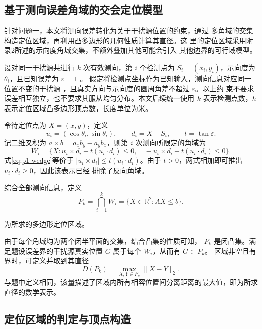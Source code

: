 \subsection{基于测向误差角域的交会定位模型}

针对问题一，本文将测向误差转化为关于干扰源位置的约束，通过
多角域的交集构造定位区域，再利用凸多边形的几何性质计算其直径。这
里的定位区域采用附录2所述的示向度角域交集，不额外叠加其他可能会引入
其他边界的可行域模型。

设对同一干扰源共进行 $k$ 次有效测向，第 $i$ 个检测点为
$S_i=(x_i,y_i)$，示向度为 $\theta_i$，且已知误差为 $\varepsilon=1^\circ$。
假定将检测点坐标作为已知输入，测向信息对应同一位置不变的干扰源
，且真实方向与示向度的圆周角差不超过 $\varepsilon$。以上约
束不要求误差相互独立，也不要求其服从均匀分布。本文后续统一使用
$k$ 表示检测点数，$h$ 表示定位区域凸多边形顶点数，长度单位为米。


令待定位点为 $X=(x,y)$，定义
\begin{equation}
u_i=(\cos\theta_i,\sin\theta_i),\qquad d_i=X-S_i,\qquad t=\tan\varepsilon.
\end{equation}
记二维叉积为 $a\times b=a_xb_y-a_yb_x$，则第 $i$ 次测向所限定的角域为
\begin{equation}\label{eq:p1-wedge}
W_i=\{X:u_i\times d_i-t(u_i\cdot d_i)\le0,\quad
-u_i\times d_i-t(u_i\cdot d_i)\le0\}.
\end{equation}
式\eqref{eq:p1-wedge}等价于 $|u_i\times d_i|\le t(u_i\cdot d_i)$。由于 $t>0$，两式相加即可推出 $u_i\cdot d_i\ge0$，因此该表示已经
排除了反向角域。

综合全部测向信息，定义
\begin{equation}\label{eq:p1-region}
P_k=\bigcap_{i=1}^{k}W_i=\{X\in\mathbb R^2:AX\le b\}.
\end{equation}

为所求的多边形定位区域。

由于每个角域均为两个闭半平面的交集，结合凸集的性质可知， $P_k$ 是闭凸集。满足题设误差界的干扰源真实位置 $G$ 属于每个 $W_i$，从而有 $G\in P_k$。
区域非空且有界时，可定义并取到其直径
\begin{equation}\label{eq:p1-diameter}
D(P_k)=\max_{X,Y\in P_k}\|X-Y\|_2.
\end{equation}
与题中定义相同，该量描述了区域内所有相容位置间分离距离的最大值，即为所求直径的数学表示。

\subsection{定位区域的判定与顶点构造}

